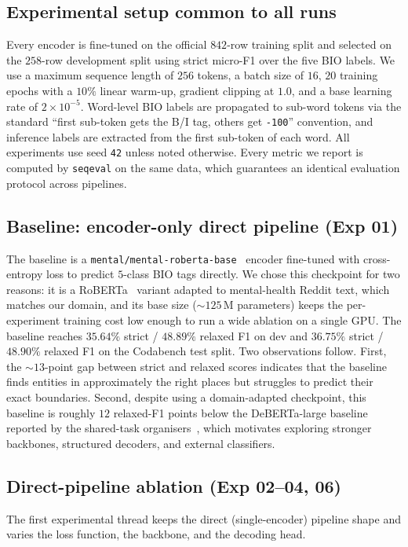 \documentclass[journal]{IEEEtran}
\begin{document}
\subsection{Experimental setup common to all runs}
\label{ssec:setup}
Every encoder is fine-tuned on the official $842$-row training split
and selected on the $258$-row development split using strict micro-F1
over the five BIO labels. We use a maximum sequence length of $256$
tokens, a batch size of $16$, $20$ training epochs with a $10\%$
linear warm-up, gradient clipping at $1.0$, and a base learning rate
of $2{\times}10^{-5}$. Word-level BIO labels are propagated to
sub-word tokens via the standard ``first sub-token gets the B/I tag,
others get \texttt{-100}'' convention, and inference labels are
extracted from the first sub-token of each word. All experiments use
seed \texttt{42} unless noted otherwise. Every metric we report is
computed by \texttt{seqeval} on the same data, which guarantees an
identical evaluation protocol across pipelines.

\subsection{Baseline: encoder-only direct pipeline (Exp 01)}
\label{ssec:baseline}
The baseline is a \texttt{mental/mental-roberta-base}~\cite{ji2022mentalbert}
encoder fine-tuned with cross-entropy loss to predict $5$-class BIO
tags directly. We chose this checkpoint for two reasons: it is a
RoBERTa~\cite{liu2019roberta} variant adapted to mental-health
Reddit text, which matches our domain, and its base size
($\sim$$125$\,M parameters) keeps the per-experiment training cost
low enough to run a wide ablation on a single GPU. The baseline
reaches $35.64\%$ strict / $48.89\%$ relaxed F1 on dev and
$36.75\%$ strict / $48.90\%$ relaxed F1 on the Codabench test split.
Two observations follow. First, the $\sim$$13$-point gap between
strict and relaxed scores indicates that the baseline finds entities
in approximately the right places but struggles to predict their
exact boundaries. Second, despite using a domain-adapted checkpoint,
this baseline is roughly $12$ relaxed-F1 points below the
DeBERTa-large baseline reported by the shared-task
organisers~\cite{dey2025inference}, which motivates exploring
stronger backbones, structured decoders, and external classifiers.

\subsection{Direct-pipeline ablation (Exp 02--04, 06)}
\label{ssec:direct}
The first experimental thread keeps the direct (single-encoder)
pipeline shape and varies the loss function, the backbone, and the
decoding head.
\end{document}
